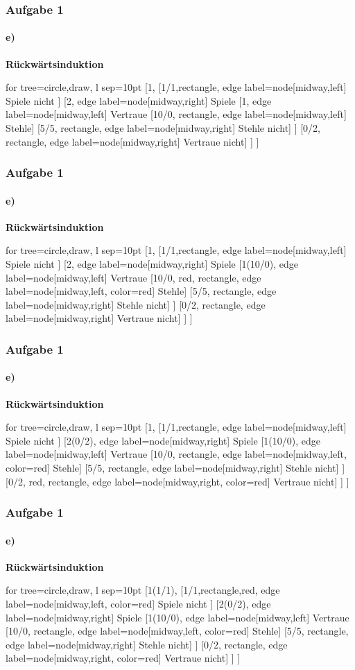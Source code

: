 \documentclass{beamer}
\begin{document}
\begin{frame}
	\frametitle{Aufgabe 1}
	\framesubtitle{e)}
	\centering
	\textbf{Rückwärtsinduktion}\\
	\begin{forest}
		for tree={circle,draw, l sep=10pt}
		[1, 
			[1/1,rectangle, edge label={node[midway,left] {Spiele nicht}} ]
			[2, edge label={node[midway,right] {Spiele}} 
				[1, edge label={node[midway,left] {Vertraue}}
					[10/0, rectangle, edge label={node[midway,left] {Stehle}}]
					[5/5, rectangle, edge label={node[midway,right] {Stehle nicht}}]
				] 
				[0/2, rectangle, edge label={node[midway,right] {Vertraue nicht}}]
			] 
		]
	\end{forest}
\end{frame}

\begin{frame}
	\frametitle{Aufgabe 1}
	\framesubtitle{e)}
	\centering
	\textbf{Rückwärtsinduktion}\\	
	\begin{forest}
		for tree={circle,draw, l sep=10pt}
		[1, 
			[1/1,rectangle, edge label={node[midway,left] {Spiele nicht}} ]
			[2, edge label={node[midway,right] {Spiele}} 
				[1(10/0), edge label={node[midway,left] {Vertraue}}
					[10/0, red, rectangle, edge label={node[midway,left, color=red] {Stehle}}]
					[5/5, rectangle, edge label={node[midway,right] {Stehle nicht}}]
				] 
				[0/2, rectangle, edge label={node[midway,right] {Vertraue nicht}}]
			] 
		]
	\end{forest}
\end{frame}

\begin{frame}
	\frametitle{Aufgabe 1}
	\framesubtitle{e)}
	\centering
	\textbf{Rückwärtsinduktion}\\	
	\begin{forest}
		for tree={circle,draw, l sep=10pt}
		[1, 
			[1/1,rectangle, edge label={node[midway,left] {Spiele nicht}} ]
			[2(0/2), edge label={node[midway,right] {Spiele}} 
				[1(10/0), edge label={node[midway,left] {Vertraue}}
					[10/0, rectangle, edge label={node[midway,left, color=red] {Stehle}}]
					[5/5, rectangle, edge label={node[midway,right] {Stehle nicht}}]
				] 
				[0/2, red, rectangle, edge label={node[midway,right, color=red] {Vertraue nicht}}]
			] 
		]
	\end{forest}
\end{frame}

\begin{frame}
	\frametitle{Aufgabe 1}
	\framesubtitle{e)}
	\centering
	\textbf{Rückwärtsinduktion}\\	
	\begin{forest}
		for tree={circle,draw, l sep=10pt}
		[1(1/1), 
			[1/1,rectangle,red, edge label={node[midway,left, color=red] {Spiele nicht}} ]
			[2(0/2), edge label={node[midway,right] {Spiele}} 
				[1(10/0), edge label={node[midway,left] {Vertraue}}
					[10/0, rectangle, edge label={node[midway,left, color=red] {Stehle}}]
					[5/5, rectangle, edge label={node[midway,right] {Stehle nicht}}]
				] 
				[0/2, rectangle, edge label={node[midway,right, color=red] {Vertraue nicht}}]
			] 
		]
	\end{forest}
\end{frame}
\end{document}
